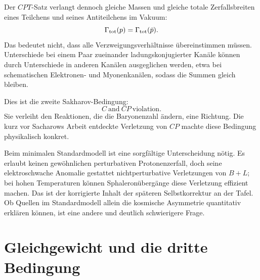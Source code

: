 Der \(CPT\)-Satz verlangt dennoch gleiche Massen und gleiche totale Zerfallsbreiten eines Teilchens und seines Antiteilchens im Vakuum:
\begin{equation}
\Gamma_{\rm tot}(p)=\Gamma_{\rm tot}(\bar p).
\end{equation}
Das bedeutet nicht, dass alle Verzweigungsverhältnisse übereinstimmen müssen. Unterschiede bei einem Paar zueinander ladungskonjugierter Kanäle können durch Unterschiede in anderen Kanälen ausgeglichen werden, etwa bei schematischen Elektronen- und Myonenkanälen, sodass die Summen gleich bleiben.

\begin{classroomqa}\end{classroomqa}

Dies ist die zweite Sakharov-Bedingung:
\begin{equation}
\boxed{C\ \text{and}\ CP\ \text{violation}.}
\end{equation}
Sie verleiht den Reaktionen, die die Baryonenzahl ändern, eine Richtung. Die kurz vor Sacharows Arbeit entdeckte Verletzung von \(CP\) machte diese Bedingung physikalisch konkret.

Beim minimalen Standardmodell ist eine sorgfältige Unterscheidung nötig. Es erlaubt keinen gewöhnlichen perturbativen Protonenzerfall, doch seine elektroschwache Anomalie gestattet nichtperturbative Verletzungen von \(B+L\); bei hohen Temperaturen können Sphaleronübergänge diese Verletzung effizient machen. Das ist der korrigierte Inhalt der späteren Selbstkorrektur an der Tafel. Ob Quellen im Standardmodell allein die kosmische Asymmetrie quantitativ erklären können, ist eine andere und deutlich schwierigere Frage.

\section{Gleichgewicht und die dritte Bedingung}

